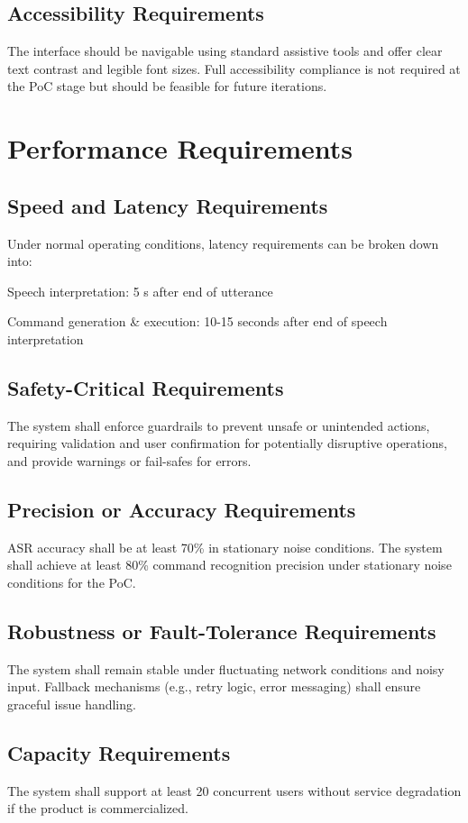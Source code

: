 \documentclass[12pt]{article}
\begin{document}
\subsection{Accessibility Requirements}
The interface should be navigable using standard assistive tools and offer clear text contrast and legible font sizes. Full accessibility compliance is not required at the PoC stage but should be feasible for future iterations.

\section{Performance Requirements}
\subsection{Speed and Latency Requirements}
Under normal operating conditions, latency requirements can be broken down into:

Speech interpretation: 5 s after end of utterance

Command generation \& execution: 10-15 seconds after end of speech interpretation
\subsection{Safety-Critical Requirements}
The system shall enforce guardrails to prevent unsafe or unintended actions, requiring validation and user confirmation for potentially disruptive operations, and provide warnings or fail-safes for errors.
\subsection{Precision or Accuracy Requirements}
ASR accuracy shall be at least 70\% in stationary noise conditions. The system shall achieve at least 80\% command recognition precision under stationary noise conditions for the PoC.
\subsection{Robustness or Fault-Tolerance Requirements}
The system shall remain stable under fluctuating network conditions and noisy input. Fallback mechanisms (e.g., retry logic, error messaging) shall ensure graceful issue handling.
\subsection{Capacity Requirements}
The system shall support at least 20 concurrent users without service degradation if the product is commercialized.
\end{document}
